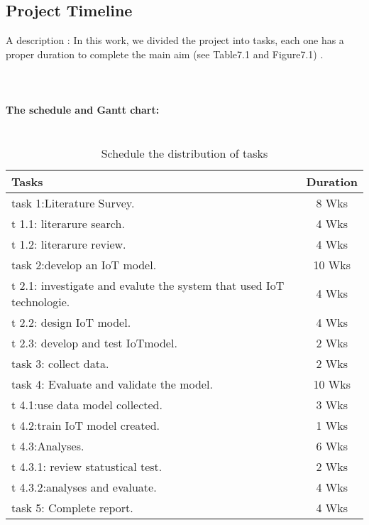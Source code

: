 \documentclass[paper=a4, fontsize=11pt]{scrartcl}
\numberwithin{equation}{section}		%
\numberwithin{figure}{section}			%
\numberwithin{table}{section}				%
\begin{document}
\section{Project Timeline}
A description : In this work, we divided the project into tasks, each one has a proper duration to complete the main aim (see Table7.1 and Figure7.1) .
\\
\\
\\
\\

\textbf{The schedule and Gantt chart: }
\\
\chapter{}
    \begin{table}[ht]
        \centering
        \begin{tabular}{|l|c|}
        \hline
            Tasks & Duration \\
             \hline
            task 1:Literature Survey.  & 8 Wks \\
                  t 1.1: literarure search. & 4 Wks \\
                  t 1.2: literarure review. & 4 Wks \\
            \hline      
            task 2:develop an IoT model.  & 10 Wks \\ 
                  t 2.1: investigate and evalute the system that used IoT technologie. & 4 Wks \\
                  t 2.2: design IoT model. & 4 Wks \\
                  t 2.3: develop and test IoTmodel. & 2 Wks \\
            \hline
            task 3: collect data. & 2 Wks \\
            \hline
            task 4: Evaluate and validate the model. & 10 Wks \\
               t 4.1:use data model collected. & 3 Wks \\
                  t 4.2:train IoT model created. & 1 Wks \\
                  t 4.3:Analyses. & 6 Wks \\
                    t 4.3.1: review statustical test. & 2 Wks\\
                    t 4.3.2:analyses and evaluate. & 4 Wks\\
            \hline
            task 5: Complete report. & 4 Wks \\
            \hline
        \end{tabular}
        \caption{Schedule the distribution of tasks}
        \label{tab:my_label}
    \end{table}
\end{document}
